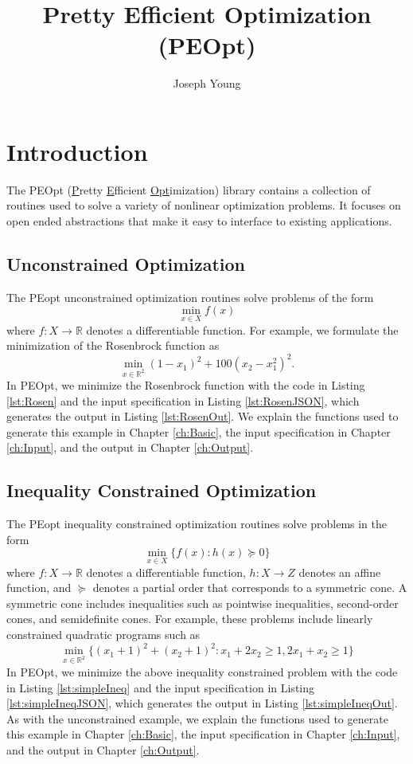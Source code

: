 \documentclass{report}
\title{Pretty Efficient Optimization (PEOpt)}
\author{Joseph Young}
\newcommand{\re}{\mathbb{R}}
\begin{document}
\maketitle
\tableofcontents

\chapter{Introduction}

        The PEOpt (\underline{P}retty \underline{E}fficient \underline{Opt}imization) library contains a collection of routines used to solve a variety of nonlinear optimization problems.  It focuses on open ended abstractions that make it easy to interface to existing applications.

\section{Unconstrained Optimization}

        The PEopt unconstrained optimization routines solve problems of the form
$$
        \min_{x\in X} f(x)
$$
where $f:X\rightarrow \re$ denotes a differentiable function.  For example, we formulate the minimization of the Rosenbrock function as
$$
        \min_{x\in\re^2} (1-x_1)^2+100(x_2-x_1^2)^2.
$$
In PEOpt, we minimize the Rosenbrock function with the code in Listing \ref{lst:Rosen} and the input specification in Listing \ref{lst:RosenJSON}, which generates the output in Listing \ref{lst:RosenOut}.  We explain the functions used to generate this example in Chapter \ref{ch:Basic}, the input specification in Chapter \ref{ch:Input}, and the output in Chapter \ref{ch:Output}.





\section{Inequality Constrained Optimization}

        The PEopt inequality constrained optimization routines solve problems in the form
$$
        \min_{x\in X} \{ f(x) : h(x)\succeq 0\}
$$
where $f:X\rightarrow \re$ denotes a differentiable function, $h:X\rightarrow Z$ denotes an affine function, and $\succeq$ denotes a partial order that corresponds to a symmetric cone.  A symmetric cone includes inequalities such as pointwise inequalities, second-order cones, and semidefinite cones.  For example, these problems include linearly constrained quadratic programs such as
$$
        \min_{x\in\re^2}\{(x_1+1)^2+(x_2+1)^2 : x_1 + 2x_2 \geq 1, 2x_1 + x_2\geq 1\}
$$
In PEOpt, we minimize the above inequality constrained problem with the code in Listing \ref{lst:simpleIneq} and the input specification in Listing \ref{lst:simpleIneqJSON}, which generates the output in Listing \ref{lst:simpleIneqOut}.  As with the unconstrained example, we explain the functions used to generate this example in Chapter \ref{ch:Basic}, the input specification in Chapter \ref{ch:Input}, and the output in Chapter \ref{ch:Output}.
\end{document}
